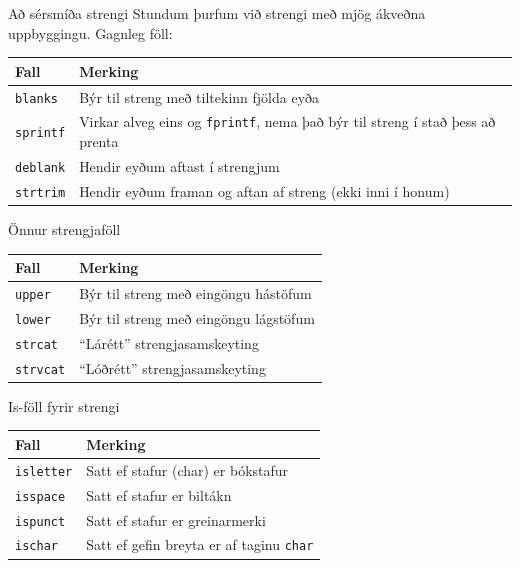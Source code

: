 \documentclass{beamer}
\begin{document}
\begin{frame}{Að sérsmíða strengi}
\vspace{\baselineskip}
Stundum þurfum við strengi með mjög ákveðna uppbyggingu. Gagnleg föll:
\begin{center}
\begin{tabular}{lp{7cm}}
\toprule
Fall&Merking\\
\midrule
\texttt{blanks}&Býr til streng með tiltekinn fjölda eyða\\
\texttt{sprintf}&Virkar alveg eins og \texttt{fprintf}, nema það býr til streng í stað þess að prenta\\
\texttt{deblank}&Hendir eyðum aftast í strengjum\\
\texttt{strtrim}&Hendir eyðum framan og aftan af streng (ekki inni í honum)\\
\bottomrule
\end{tabular}
\end{center}
\end{frame}

\begin{frame}[fragile]{Önnur strengjaföll}
\begin{center}
\begin{tabular}{ll}
\toprule
Fall&Merking\\
\midrule
\texttt{upper}&Býr til streng með eingöngu hástöfum\\
\texttt{lower}&Býr til streng með eingöngu lágstöfum\\
\texttt{strcat}&``Lárétt'' strengjasamskeyting\\
\texttt{strvcat}&``Lóðrétt'' strengjasamskeyting\\
\bottomrule
\end{tabular}
\end{center}
\end{frame}

\begin{frame}[fragile]{Is-föll fyrir strengi}
\begin{center}
\begin{tabular}{ll}
\toprule
Fall&Merking\\
\midrule
\texttt{isletter}&Satt ef stafur (char) er bókstafur\\
\texttt{isspace}&Satt ef stafur er biltákn\\
\texttt{ispunct}&Satt ef stafur er greinarmerki\\
\texttt{ischar}&Satt ef gefin breyta er af taginu \texttt{char}\\
\bottomrule
\end{tabular}
\end{center}

\end{frame}
\end{document}
